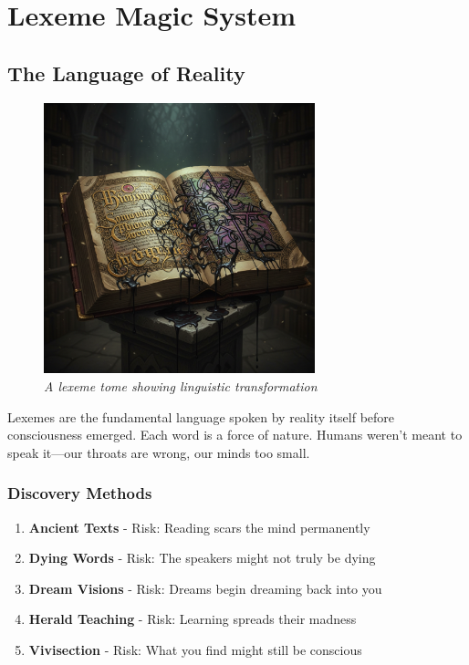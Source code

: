 \documentclass[11pt,a4paper,twoside]{book}
\begin{document}
\chapter{Lexeme Magic System}

\section{The Language of Reality}

\begin{figure}[h]
\centering
\includegraphics[width=0.7\textwidth]{images/lexeme_tome_2025-09-03T22-22-18-359Z_1.png}
\caption*{\textit{A lexeme tome showing linguistic transformation}}
\end{figure}

Lexemes are the fundamental language spoken by reality itself before consciousness emerged. Each word is a force of nature. Humans weren't meant to speak it—our throats are wrong, our minds too small.

\subsection{Discovery Methods}

\begin{tcolorbox}[codexbox={Acquiring Lexemes}]
\begin{enumerate}
    \item \textbf{Ancient Texts} - Risk: Reading scars the mind permanently
    \item \textbf{Dying Words} - Risk: The speakers might not truly be dying
    \item \textbf{Dream Visions} - Risk: Dreams begin dreaming back into you
    \item \textbf{Herald Teaching} - Risk: Learning spreads their madness
    \item \textbf{Vivisection} - Risk: What you find might still be conscious
\end{enumerate}
\end{tcolorbox}
\end{document}
